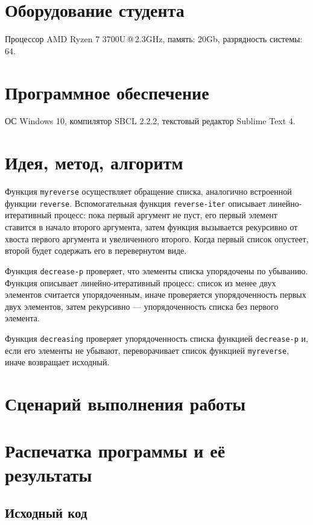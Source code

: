 \documentclass[12pt]{article}
\begin{document}
\section{Оборудование студента}
Процессор AMD Ryzen 7 3700U\,@\,2.3GHz, память: 20Gb, разрядность системы: 64.

\section{Программное обеспечение}
ОС Windows 10, компилятор SBCL 2.2.2, текстовый редактор Sublime Text 4.

\section{Идея, метод, алгоритм}
Функция {\tt myreverse} осуществляет обращение списка, аналогично встроенной функции {\tt reverse}. Вспомогательная функция {\tt reverse-iter} описывает линейно-итеративный процесс: пока первый аргумент не пуст, его первый элемент ставится в начало второго аргумента, затем функция вызывается рекурсивно от хвоста первого аргумента и увеличенного второго. Когда первый список опустеет, второй будет содержать его в перевернутом виде.

Функция {\tt decrease-p} проверяет, что элементы списка упорядочены по убыванию. Функция описывает линейно-итеративный процесс: список из менее двух элементов считается упорядоченным, иначе проверяется упорядоченность первых двух элементов, затем рекурсивно --- упорядоченность списка без первого элемента.

Функция {\tt decreasing} проверяет упорядоченность списка функцией {\tt decrease-p} и, если его элементы не убывают, переворачивает список функцией {\tt myreverse}, иначе возвращает исходный.

\section{Сценарий выполнения работы}

\section{Распечатка программы и её результаты}

\subsection{Исходный код}

\end{document}
